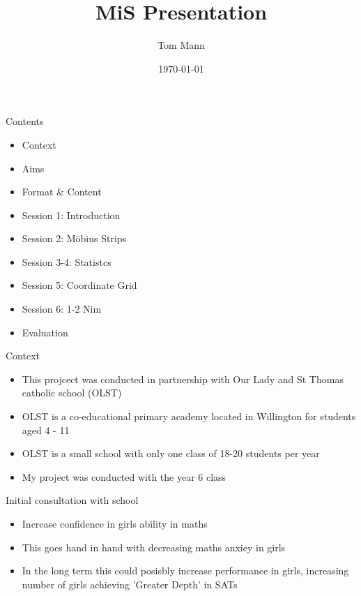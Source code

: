 \documentclass{beamer}  %
\title{MiS Presentation}
\author{Tom Mann}
\date{\today}
\begin{document}
\begin{frame}
    \titlepage
\end{frame}

\begin{frame}{Contents}
    \begin{itemize}
        \item Context
        \item Aims
        \item Format \& Content
        \item Session 1: Introduction
        \item Session 2: M\"{o}bius Strips
        \item Session 3-4: Statistcs
        \item Session 5: Coordinate Grid
        \item Session 6: 1-2 Nim
        \item Evaluation
    \end{itemize}
\end{frame}

\begin{frame}{Context}
    \begin{itemize}
        \item This projcect was conducted in partnership with Our Lady and St Thomas catholic school (OLST)
        \item OLST is a co-educational primary academy located in Willington for students aged 4 - 11
        \item OLST is a small school with only one class of 18-20 students per year
        \item My project was conducted with the year 6 class
    \end{itemize}
\end{frame}

\begin{frame}{Initial consultation with school}
    \begin{itemize}
        \item Increase confidence in girls ability in maths
        \item This goes hand in hand with decreasing maths anxiey in girls
        \item In the long term this could posisbly increase performance in girls, increasing number of girls achieving 'Greater Depth' in SATs
    \end{itemize}
\end{frame}
\end{document}
